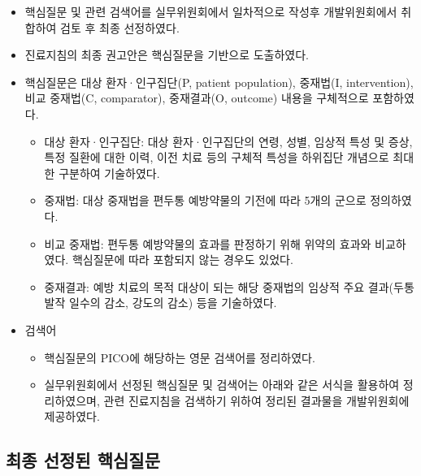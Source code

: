 \documentclass[]{book}
\providecommand{\tightlist}{%
  \setlength{\itemsep}{0pt}\setlength{\parskip}{0pt}}
\begin{document}
\begin{itemize}
\item
  핵심질문 및 관련 검색어를 실무위원회에서 일차적으로 작성후 개발위원회에서 취합하여 검토 후 최종 선정하였다.
\item
  진료지침의 최종 권고안은 핵심질문을 기반으로 도출하였다.
\item
  핵심질문은 대상 환자·인구집단(P, patient population), 중재법(I, intervention), 비교 중재법(C, comparator), 중재결과(O, outcome) 내용을 구체적으로 포함하였다.

  \begin{itemize}
  \tightlist
  \item
    대상 환자·인구집단: 대상 환자·인구집단의 연령, 성별, 임상적 특성 및 증상, 특정 질환에 대한 이력, 이전 치료 등의 구체적 특성을 하위집단 개념으로 최대한 구분하여 기술하였다.\\
  \item
    중재법: 대상 중재법을 편두통 예방약물의 기전에 따라 5개의 군으로 정의하였다.
  \item
    비교 중재법: 편두통 예방약물의 효과를 판정하기 위해 위약의 효과와 비교하였다. 핵심질문에 따라 포함되지 않는 경우도 있었다.
  \item
    중재결과: 예방 치료의 목적 대상이 되는 해당 중재법의 임상적 주요 결과(두통 발작 일수의 감소, 강도의 감소) 등을 기술하였다.
  \end{itemize}
\item
  검색어

  \begin{itemize}
  \tightlist
  \item
    핵심질문의 PICO에 해당하는 영문 검색어를 정리하였다.
  \item
    실무위원회에서 선정된 핵심질문 및 검색어는 아래와 같은 서식을 활용하여 정리하였으며, 관련 진료지침을 검색하기 위하여 정리된 결과물을 개발위원회에 제공하였다.
  \end{itemize}
\end{itemize}

\hypertarget{section-52}{%
\subsection{최종 선정된 핵심질문}\label{section-52}}
\end{document}
